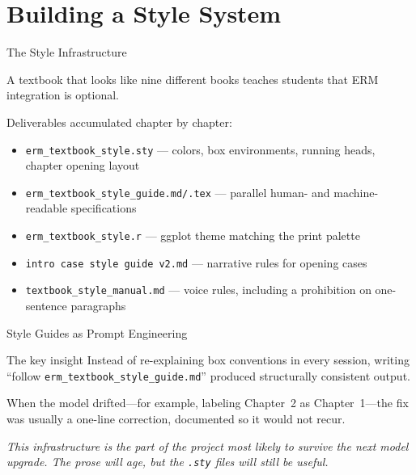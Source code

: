 \documentclass[aspectratio=169]{beamer}
\begin{document}
\section{Building a Style System}

\begin{frame}{The Style Infrastructure}

A textbook that looks like nine different books teaches students that ERM
integration is optional.

\bigskip
Deliverables accumulated chapter by chapter:

\begin{itemize}\setlength\itemsep{0.6em}
  \item \texttt{erm\_textbook\_style.sty} --- colors, box environments,
        running heads, chapter opening layout
  \item \texttt{erm\_textbook\_style\_guide.md/.tex} --- parallel human- and
        machine-readable specifications
  \item \texttt{erm\_textbook\_style.r} --- ggplot theme matching the print
        palette
  \item \texttt{intro case style guide v2.md} --- narrative rules for opening
        cases
  \item \texttt{textbook\_style\_manual.md} --- voice rules, including a
        prohibition on one-sentence paragraphs
\end{itemize}

\end{frame}

\begin{frame}{Style Guides as Prompt Engineering}

\begin{block}{The key insight}
Instead of re-explaining box conventions in every session, writing
``follow \texttt{erm\_textbook\_style\_guide.md}'' produced structurally
consistent output.
\end{block}

\bigskip
When the model drifted---for example, labeling Chapter~2 as Chapter~1---the
fix was usually a one-line correction, documented so it would not recur.

\bigskip
\textit{This infrastructure is the part of the project most likely to
survive the next model upgrade. The prose will age, but the \texttt{.sty}
files will still be useful.}

\end{frame}
\end{document}
